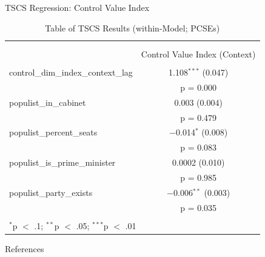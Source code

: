 \documentclass[
  ignorenonframetext,
]{beamer}
\begin{document}
\begin{frame}{TSCS Regression: Control Value Index}
\protect\hypertarget{tscs-regression-control-value-index}{}

\begin{table}[!htbp] \centering 
  \caption{Table of TSCS Results (within-Model; PCSEs)} 
  \label{} 
\scriptsize 
\begin{tabular}{@{\extracolsep{5pt}}lc} 
\\[-1.8ex]\hline \\[-1.8ex] 
\\[-1.8ex] & Control Value Index (Context) \\ 
\hline \\[-1.8ex] 
 control\_dim\_index\_context\_lag & 1.108$^{***}$ (0.047) \\ 
  & p = 0.000 \\ 
  populist\_in\_cabinet & 0.003 (0.004) \\ 
  & p = 0.479 \\ 
  populist\_percent\_seats & $-$0.014$^{*}$ (0.008) \\ 
  & p = 0.083 \\ 
  populist\_is\_prime\_minister & 0.0002 (0.010) \\ 
  & p = 0.985 \\ 
  populist\_party\_exists & $-$0.006$^{**}$ (0.003) \\ 
  & p = 0.035 \\ 
 \hline \\[-1.8ex] 
\multicolumn{2}{l}{$^{*}$p $<$ .1; $^{**}$p $<$ .05; $^{***}$p $<$ .01} \\ 
\end{tabular} 
\end{table}

\end{frame}

\begin{frame}{References}
\protect\hypertarget{references}{}

\end{frame}
\end{document}
